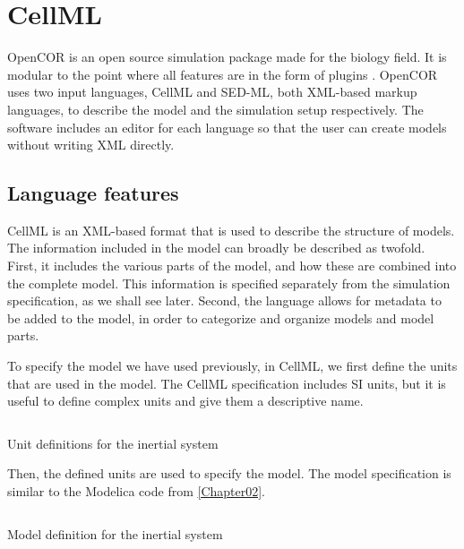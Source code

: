 \documentclass[\rootfolder/main.tex]{subfiles}
\begin{document}
\section{CellML}

OpenCOR is an open source simulation package made for the biology field.
It is modular to the point where all features are in the form of plugins \cite{10.3389/fphys.2015.00026}.
OpenCOR uses two input languages, CellML and SED-ML, both XML-based markup languages, to describe the model and the simulation setup respectively.
The software includes an editor for each language so that the user can create models without writing XML directly.

\subsection{Language features}

CellML \cite{cuellar2003} is an XML-based format that is used to describe the structure of models.
The information included in the model can broadly be described as twofold.
First, it includes the various parts of the model, and how these are combined into the complete model.
This information is specified separately from the simulation specification, as we shall see later.
Second, the language allows for metadata to be added to the model, in order to categorize and organize models and model parts.

To specify the model we have used previously, in CellML, we first define the units that are used in the model.
The CellML specification includes SI units, but it is useful to define complex units and give them a descriptive name.

\begin{listing}[ht]
    \inputminted[fontsize=\footnotesize, lastline=27]{matlab}{\rootfolder/Models/OpenCOR/Inertial.input}
    \caption{Unit definitions for the inertial system\label{lst:inertial-cellml-units}}
\end{listing}

Then, the defined units are used to specify the model.
The model specification is similar to the Modelica code from \ref{Chapter02}.

\begin{listing}[ht]
    \inputminted[fontsize=\footnotesize, firstline=28]{matlab}{\rootfolder/Models/OpenCOR/Inertial.input}
    \caption{Model definition for the inertial system\label{lst:inertial-cellml-units}}
\end{listing}
\end{document}
